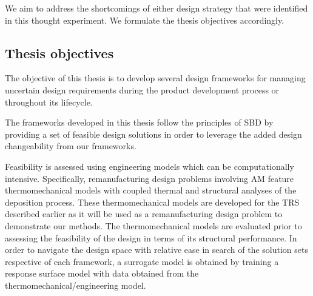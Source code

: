 We aim to address the shortcomings of either design strategy that were identified in this thought experiment. We formulate the thesis objectives accordingly.

\subsection{Thesis objectives} \label{subsec:objectives}




The objective of this thesis is to develop several design frameworks for managing uncertain design requirements during the product development process or throughout its lifecycle. 

The frameworks developed in this thesis follow the principles of \acf{SBD} by providing a set of feasible design solutions in order to leverage the added design changeability from our frameworks. 

Feasibility is assessed using engineering models which can be computationally intensive. Specifically, remanufacturing design problems involving \ac{AM} feature thermomechanical models with coupled thermal and structural analyses of the deposition process. These thermomechanical models are developed for the \ac{TRS} described earlier as it will be used as a remanufacturing design problem to demonstrate our methods. The thermomechanical models are evaluated prior to assessing the feasibility of the design in terms of its structural performance. In order to navigate the design space with relative ease in search of the solution sets respective of each framework, a surrogate model is obtained by training a response surface model with data obtained from the thermomechanical/engineering model.

